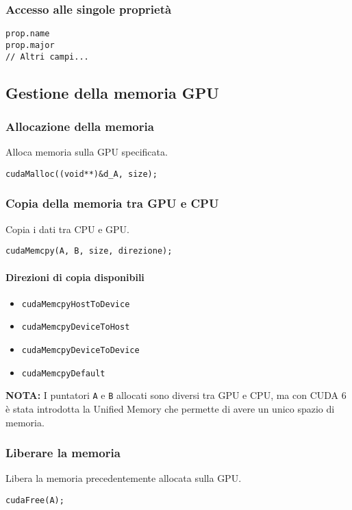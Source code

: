 \documentclass[a4paper,12pt]{article}
\begin{document}
\subsubsection{Accesso alle singole proprietà}
\begin{verbatim}
prop.name
prop.major
// Altri campi...
\end{verbatim}

\subsection{Gestione della memoria GPU}

\subsubsection{Allocazione della memoria}
Alloca memoria sulla GPU specificata.
\begin{verbatim}
cudaMalloc((void**)&d_A, size);
\end{verbatim}

\subsubsection{Copia della memoria tra GPU e CPU}
Copia i dati tra CPU e GPU.
\begin{verbatim}
cudaMemcpy(A, B, size, direzione);
\end{verbatim}

\paragraph{Direzioni di copia disponibili}
\begin{itemize}
    \item \texttt{cudaMemcpyHostToDevice}
    \item \texttt{cudaMemcpyDeviceToHost}
    \item \texttt{cudaMemcpyDeviceToDevice}
    \item \texttt{cudaMemcpyDefault}
\end{itemize}
\textbf{NOTA:} I puntatori \texttt{A} e \texttt{B} allocati sono diversi tra GPU e CPU, ma con CUDA 6 è stata introdotta la Unified Memory che permette di avere un unico spazio di memoria.

\subsubsection{Liberare la memoria}
Libera la memoria precedentemente allocata sulla GPU.
\begin{verbatim}
cudaFree(A);
\end{verbatim}
\end{document}
